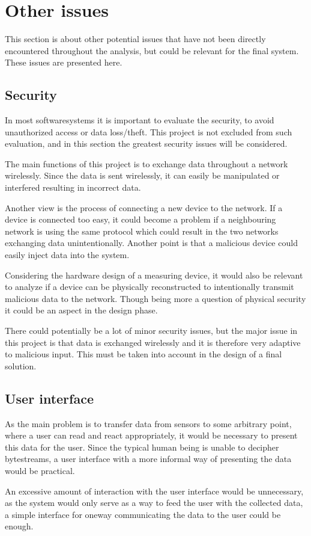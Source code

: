 \section{Other issues}
This section is about other potential issues that have not been directly encountered throughout the analysis, but could be relevant for the final system. These issues are presented here.

\subsection{Security}
In most softwaresystems it is important to evaluate the security, to avoid unauthorized access or data loss/theft. This project is not excluded from such evaluation, and in this section the greatest security issues will be considered.

The main functions of this project is to exchange data throughout a network wirelessly. Since the data is sent wirelessly, it can easily be manipulated or interfered resulting in incorrect data.

Another view is the process of connecting a new device to the network. If a device is connected too easy, it could become a problem if a neighbouring network is using the same protocol which could result in the two networks exchanging data unintentionally. Another point is that a malicious device could easily inject data into the system.

Considering the hardware design of a measuring device, it would also be relevant to analyze if a device can be physically reconstructed to intentionally transmit malicious data to the network. Though being more a question of physical security it could be an aspect in the design phase.

There could potentially be a lot of minor security issues, but the major issue in this project is that data is exchanged wirelessly and it is therefore very adaptive to malicious input. This must be taken into account in the design of a final solution.

\subsection{User interface}
As the main problem is to transfer data from sensors to some arbitrary point, where a user can read and react appropriately, it would be necessary to present this data for the user. Since the typical human being is unable to decipher bytestreams, a user interface with a more informal way of presenting the data would be practical.

An excessive amount of interaction with the user interface would be unnecessary, as the system would only serve as a way to feed the user with the collected data, a simple interface for oneway communicating the data to the user could be enough.
